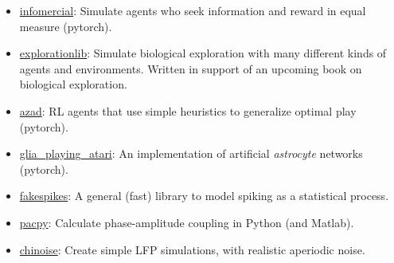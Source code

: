 \begin{itemize}
\tightlist
\item
  \href{https://github.com/CoAxLab/infomercial}{infomercial}: Simulate
  agents who seek information and reward in equal measure (pytorch).
\item
  \href{https://github.com/parenthetical-e/explorationlib}{explorationlib}:
  Simulate biological exploration with many different kinds of agents
  and environments. Written in support of an upcoming book on biological
  exploration.
\item
  \href{https://github.com/CoAxLab/azad}{azad}: RL agents that use
  simple heuristics to generalize optimal play (pytorch).
\item
  \href{https://github.com/CoAxLab/glia_playing_atari}{glia\_playing\_atari}:
  An implementation of artificial \emph{astrocyte} networks (pytorch).
\item
  \href{https://github.com/voytekresearch/fakespikes}{fakespikes}: A
  general (fast) library to model spiking as a statistical process.
\item
  \href{https://github.com/voytekresearch/pacpy}{pacpy}: Calculate
  phase-amplitude coupling in Python (and Matlab).
\item
  \href{https://github.com/voytekresearch/chinoise}{chinoise}: Create
  simple LFP simulations, with realistic aperiodic noise.
\end{itemize}
